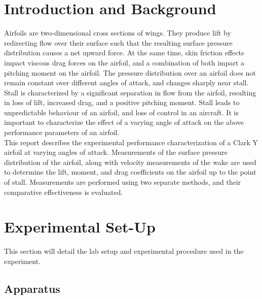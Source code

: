 \documentclass[runningheads]{llncs}
\begin{document}


\section{Introduction and Background}\label{sec:introduction_and_background}

Airfoils are two-dimensional cross sections of wings. They produce lift by redirecting flow over their surface such that the resulting surface pressure distribution causes a net upward force. At the same time, skin friction effects impact viscous drag forces on the airfoil, and a combination of both impart a pitching moment on the airfoil. The pressure distribution over an airfoil does not remain constant over different angles of attack, and changes sharply near stall.\\

Stall is characterized by a significant separation in flow from the airfoil, resulting in loss of lift, increased drag, and a positive pitching moment. Stall leads to unpredictable behaviour of an airfoil, and loss of control in an aircraft. It is important to characterize the effect of a varying angle of attack on the above performance parameters of an airfoil.\\

This report describes the experimental performance characterization of a Clark Y airfoil at varying angles of attack. Measurements of the surface pressure distribution of the airfoil, along with velocity measurements of the wake are used to determine the lift, moment, and drag coefficients on the airfoil up to the point of stall. Measurements are performed using two separate methods, and their comparative effectiveness is evaluated.




\section{Experimental Set-Up}

This section will detail the lab setup and experimental procedure used in the experiment.

\subsection{Apparatus}
\end{document}
